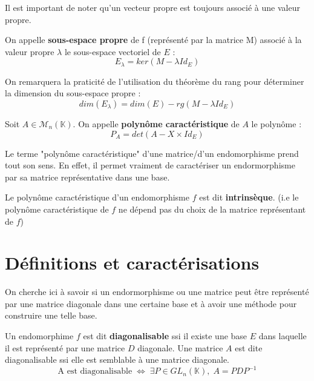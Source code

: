 Il est important de noter qu'un vecteur propre est toujours associé à une valeur propre. 

\begin{definition}
    On appelle \textbf{sous-espace propre} de f (représenté par la matrice M) associé à la valeur propre $\lambda$ le sous-espace vectoriel de $E$ : 
    \[ \boxed{E_\lambda = ker(M - \lambda Id_E)} \]
\end{definition}

On remarquera la praticité de l'utilisation du théorème du rang pour déterminer la dimension du sous-espace propre : \[ dim(E_\lambda) = dim(E) - rg(M - \lambda Id_E) \]

\begin{definition}
    Soit $A \in \mathcal{M}_n(\mathbb{K}) $. On appelle \textbf{polynôme caractéristique} de $A$ le polynôme : 
    \[ P_A = det(A - X \times Id_E) \]
\end{definition}

Le terme "polynôme caractéristique" d'une matrice/d'un endomorphisme prend tout son sens. 
En effet, il permet vraiment de caractériser un endormorphisme par sa matrice représentative dans une base. 

\begin{remark}
    Le polynôme caractéristique d'un endomorphisme $f$ est dit \textbf{intrinsèque}.
    (i.e le polynôme caractéristique de $f$ ne dépend pas du choix de la matrice représentant de $f$)
\end{remark}




\section{Définitions et caractérisations}

On cherche ici à savoir si un endormorphisme ou une matrice peut être représenté par une matrice diagonale dans une certaine base 
et à avoir une méthode pour construire une telle base. 

\begin{definition}
    Un endomorphime $f$ est dit \textbf{diagonalisable} ssi il existe une base $E$ dans laquelle il est représenté par une matrice $D$ diagonale. 
    Une matrice $A$ est dite diagonalisable ssi elle est semblable à une matrice diagonale. 
    \[ \boxed{ \text{A est diagonalisable} \; \Leftrightarrow \; \exists P \in GL_n(\mathbb{K}), \; A = PDP^{-1} } \]
\end{definition}

